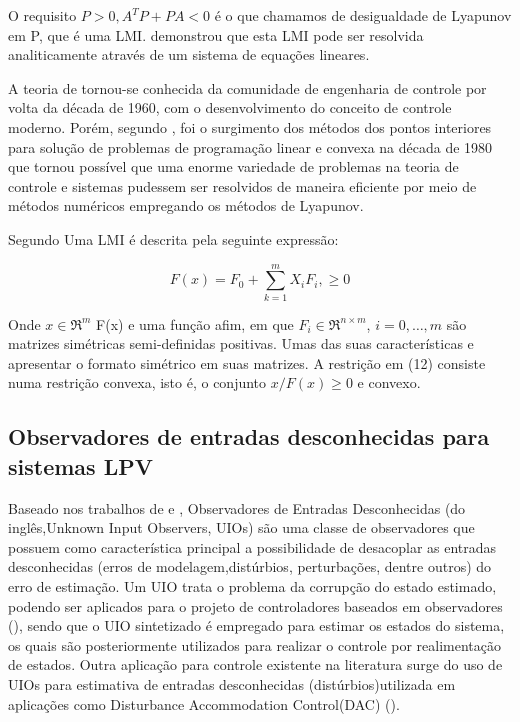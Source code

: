 O requisito $P>0, A^{T} P + PA < 0$ é o que chamamos de desigualdade de Lyapunov em P, que é uma LMI. \cite{Lyapunov1992TheMotion} demonstrou que esta LMI pode ser resolvida analiticamente através de um sistema de equações lineares.
        
A teoria de \cite{Lyapunov1992TheMotion} tornou-se conhecida da comunidade de engenharia de controle por volta da década de 1960, com o desenvolvimento do conceito de controle moderno. Porém, segundo \cite{Rodrigues2018ParameterizedSystems}, foi o surgimento dos métodos dos pontos interiores para solução de problemas de programação linear e convexa na década de 1980 que tornou possível que uma enorme variedade de problemas na teoria de controle e sistemas pudessem ser resolvidos de maneira eficiente por meio de métodos numéricos empregando os métodos de Lyapunov.

Segundo \cite{Boyd1994LinearTheory} Uma LMI é descrita pela seguinte expressão:

\begin{equation}\label{eq:defLMI}
    F(x) = F_0 + \sum^{m}_{k=1}X_iF_i, \geq 0
\end{equation}

Onde $x \in \Re^{m}$ F(x) e uma função afim, em que $F_i \in \Re^{n \times m}$, $i = 0, \dots, m$ são matrizes simétricas semi-definidas positivas. Umas das suas características e apresentar o formato simétrico em suas matrizes. A restrição em (12) consiste numa restrição convexa, isto é, o conjunto $x/F(x)\geq 0$ e convexo.
        
\subsection{Observadores de entradas desconhecidas para sistemas LPV}
Baseado nos trabalhos de \cite{SilvaSinteseEstados} e \cite{Dias2022ItaloDias}, Observadores de Entradas Desconhecidas (do inglês,Unknown Input Observers, UIOs) são uma classe de observadores que possuem como característica principal a possibilidade de desacoplar as entradas desconhecidas (erros de modelagem,distúrbios, perturbações, dentre outros) do erro de estimação. Um UIO trata o problema da corrupção do estado estimado, podendo ser aplicados para o projeto de controladores baseados em observadores (\cite{Zasadzinski1995LoopTR}), sendo que o UIO sintetizado é empregado para estimar os estados do sistema, os quais são posteriormente utilizados para realizar o controle por realimentação de estados. Outra aplicação para controle existente na literatura surge do uso de UIOs para estimativa de entradas desconhecidas (distúrbios)utilizada em aplicações como Disturbance Accommodation Control(DAC) (\cite{Chen2016Disturbance-Observer-BasedOverview}).

